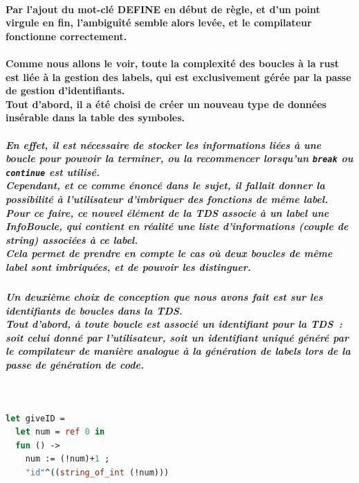 \documentclass[french]{article}
\begin{document}
\paragraph{Par l'ajout du mot-clé DEFINE en début de règle, et d'un point virgule en fin, l'ambiguîté semble alors levée, et le compilateur fonctionne 
correctement.}
\paragraph*{Comme nous allons le voir, toute la complexité des boucles à la rust est liée à la gestion des labels, qui est exclusivement gérée par la passe de gestion d'identifiants.\\
Tout d'abord, il a été choisi de créer un nouveau type de données insérable dans la table des symboles.}
\subparagraph*{En effet, il est nécessaire de stocker les informations liées à une boucle pour pouvoir la terminer, ou la recommencer
lorsqu'un \texttt{break} ou \texttt{continue} est utilisé.\\
Cependant, et ce comme énoncé dans le sujet, il fallait donner la possibilité à l'utilisateur d'imbriquer des fonctions de même label.\\
Pour ce faire, ce nouvel élément de la TDS associe à un label une InfoBoucle, qui contient en réalité une liste d'informations (couple de \emph{string}) associées à ce label.\\
Cela permet de prendre en compte le cas où deux boucles de même label sont imbriquées, et de pouvoir les distinguer. \\} %
\subparagraph*{Un deuxième choix de conception que nous avons fait est sur les identifiants de boucles dans la TDS.\\
Tout d'abord, à toute boucle est associé un identifiant pour la TDS~: soit celui donné par l'utilisateur, soit un identifiant uniqué généré par le compilateur
de manière analogue à la génération de labels lors de la passe de génération de code.}
\,
\begin{lstlisting}[language=Ocaml]
let giveID = 
  let num = ref 0 in
  fun () ->
    num := (!num)+1 ;
    "id"^((string_of_int (!num)))
\end{lstlisting}
\end{document}
